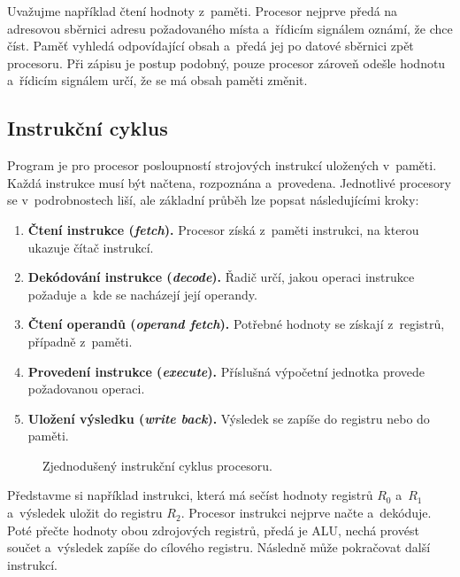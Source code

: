 Uvažujme například čtení hodnoty z~paměti. Procesor nejprve předá na adresovou sběrnici adresu požadovaného místa a~řídicím signálem oznámí, že chce číst. Paměť vyhledá odpovídající obsah a~předá jej po datové sběrnici zpět procesoru. Při zápisu je postup podobný, pouze procesor zároveň odešle hodnotu a~řídicím signálem určí, že se má obsah paměti změnit.


\subsection{Instrukční cyklus}\label{subsec:hw-instrukcni-cyklus}

Program je pro procesor posloupností strojových instrukcí uložených v~paměti. Každá instrukce musí být načtena, rozpoznána a~provedena. Jednotlivé procesory se v~podrobnostech liší, ale základní průběh lze popsat následujícími kroky:
\begin{enumerate}
    \item \textbf{Čtení instrukce (\emph{fetch}).} Procesor získá z~paměti instrukci, na kterou ukazuje čítač instrukcí.
    \item \textbf{Dekódování instrukce (\emph{decode}).} Řadič určí, jakou operaci instrukce požaduje a~kde se nacházejí její operandy.
    \item \textbf{Čtení operandů (\emph{operand fetch}).} Potřebné hodnoty se získají z~registrů, případně z~paměti.
    \item \textbf{Provedení instrukce (\emph{execute}).} Příslušná výpočetní jednotka provede požadovanou operaci.
    \item \textbf{Uložení výsledku (\emph{write back}).} Výsledek se zapíše do registru nebo do paměti.
\end{enumerate}

\begin{figure}[ht]
    \centering
    
    \caption{Zjednodušený instrukční cyklus procesoru.}
    \label{fig:hw-instrukcni-cyklus}
\end{figure}

Představme si například instrukci, která má sečíst hodnoty registrů $R_0$ a~$R_1$ a~výsledek uložit do registru $R_2$. Procesor instrukci nejprve načte a~dekóduje. Poté přečte hodnoty obou zdrojových registrů, předá je ALU, nechá provést součet a~výsledek zapíše do cílového registru. Následně může pokračovat další instrukcí.

